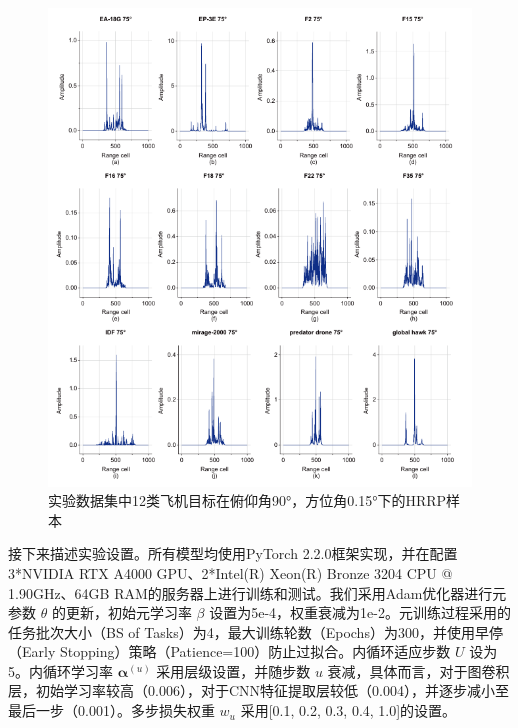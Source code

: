 \begin{figure}[h!]
    \centering
    \includegraphics[width=\linewidth]{figures/hrrp_samples.pdf} %
    \caption{实验数据集中12类飞机目标在俯仰角90°，方位角0.15°下的HRRP样本}
    \label{fig:dataset_chap3}
\end{figure}

接下来描述实验设置。所有模型均使用PyTorch 2.2.0框架实现，并在配置3*NVIDIA RTX A4000 GPU、2*Intel(R) Xeon(R) Bronze 3204 CPU @ 1.90GHz、64GB RAM的服务器上进行训练和测试。我们采用Adam优化器进行元参数 $\theta$ 的更新，初始元学习率 $\beta$ 设置为5e-4，权重衰减为1e-2。元训练过程采用的任务批次大小（BS of Tasks）为4，最大训练轮数（Epochs）为300，并使用早停（Early Stopping）策略（Patience=100）防止过拟合。内循环适应步数 $U$ 设为5。内循环学习率 $\boldsymbol{\alpha}^{(u)}$ 采用层级设置，并随步数 $u$ 衰减，具体而言，对于图卷积层，初始学习率较高（0.006），对于CNN特征提取层较低（0.004），并逐步减小至最后一步（0.001）。多步损失权重 $w_u$ 采用[0.1, 0.2, 0.3, 0.4, 1.0]的设置。

